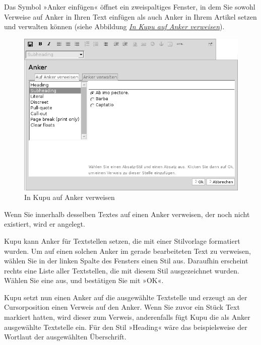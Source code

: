\documentclass[a4paper,12pt,ngerman]{manual}
\begin{document}
Das Symbol »Anker einfügen« öffnet ein zweispaltiges Fenster, in dem Sie
sowohl Verweise auf Anker in Ihren Text einfügen als auch Anker in Ihrem
Artikel setzen und verwalten können (siehe
Abbildung \hyperlink{fig-kupu-auf-anker-verweisen}{\emph{In Kupu auf Anker verweisen}}).
\hypertarget{fig-kupu-auf-anker-verweisen}{}\begin{figure}[htbp]
\centering

\includegraphics{kupu-auf-anker-verweisen.png}
\caption{In Kupu auf Anker verweisen}\end{figure}

Wenn Sie innerhalb desselben Textes auf
einen Anker verweisen, der noch nicht existiert, wird er angelegt.

Kupu kann Anker für Textstellen setzen, die mit einer Stilvorlage formatiert
wurden. Um auf einen solchen Anker im gerade bearbeiteten Text zu verweisen,
wählen Sie in der linken Spalte des Fensters einen Stil aus. Daraufhin
erscheint rechts eine Liste aller Textstellen, die mit diesem Stil
ausgezeichnet wurden. Wählen Sie eine aus, und bestätigen Sie mit »OK«.

Kupu setzt nun einen Anker auf die ausgewählte Textstelle und erzeugt an der
Cursorposition einen Verweis auf den Anker. Wenn Sie zuvor ein Stück Text
markiert hatten, wird dieser zum Verweis, anderenfalls fügt Kupu die als Anker
ausgewählte Textstelle ein. Für den Stil »Heading« wäre das beispielsweise der
Wortlaut der ausgewählten Überschrift.
\end{document}
